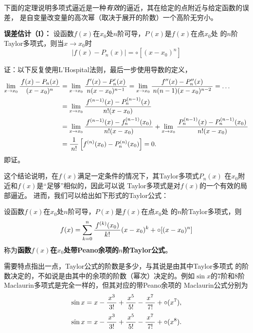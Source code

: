下面的定理说明多项式逼近是一种{\it 有效}的逼近，其在给定的点附近与给定函数的误差，
是自变量改变量的高次幂（取决于展开的阶数）一个高阶无穷小。

\begin{thx}
	{\bf 误差估计（I）：}
	设函数$f(x)$在$x_0$处$n$阶可导，$P(x)$是$f(x)$在点$x_0$处
	的$n$阶Taylor多项式，则当$x\to x_0$时
	$${|f(x)-P_n(x)|=\circ[(x-x_0)^n]}$$
\end{thx}

证：以下反复使用L'Hospital法则，最后一步使用导数的定义，
\begin{align*}
	\lim\limits_{x\to{x_0}}\displaystyle\frac{\,{f(x)-P_n(x)}\,}{\,{(x-x_0)^n}\,}
	&=\lim\limits_{x\to{x_0}}\displaystyle\frac{\,{f'(x)-P'_n(x)}\,}{\,{n(x-x_0)^{n-1}}\,}
	=\lim\limits_{x\to{x_0}}\displaystyle\frac{\,{f''(x)-P''_n(x)}\,}{\,{n(n-1)(x-x_0)^{n-2}}\,}=\ldots\\
	&=\lim\limits_{x\to{x_0}}\displaystyle\frac{\,{f^{(n-1)}(x)-P^{(n-1)}_n(x)}\,}{\,{n!(x-x_0)}\,}\\
	&=\lim\limits_{x\to{x_0}}\displaystyle\frac{\,{f^{(n-1)}(x)-f^{(n-1)}_n(x_0)}\,}{\,{n!(x-x_0)}\,}
	+\lim\limits_{x\to{x_0}}\displaystyle\frac{\,{P_n^{(n-1)}(x)-P^{(n-1)}_n(x_0)}\,}{\,{n!(x-x_0)}\,}\\
	&=\displaystyle\frac{\,{1}\,}{\,{n!}\,}\left[f^{(n)}(x_0)-P_n^{(n)}(x_0)\right]=0.
\end{align*}
即证。\fin

这个结论说明，在$f(x)$满足一定条件的情况下，其Taylor多项式$P_n(x)$
在$x_0$附近和$f(x)$是{\kaishu “足够”}相似的，因此可以说
Taylor多项式是对$f(x)$的一个有效的{\kaishu 局部逼近}。
进而，我们可以给出如下形式的Taylor公式：

\begin{thx}
	设函数$f(x)$在$x_0$处$n$阶可导，$P(x)$是$f(x)$在点$x_0$处
	的$n$阶Taylor多项式，则
	  $$f(x)=\sum\limits_{k=0}^n\displaystyle\frac{\,{f^{(k)}(x_0)}\,}{\,{k!}\,}(x-x_0)^k
	  +\circ[(x-x_0)^n]$$
	称为{\bf 函数$f(x)$在$x_0$处带Peano余项的$n$阶Taylor公式}。
\end{thx}

需要特点指出一点，Taylor公式的阶数是多少，与其说是由其中Taylor多项式
的阶数决定的，不如说是由其中的余项的阶数（幂次）决定的。例如$\sin x$的7阶和8阶Maclaurin多项式是完全一样的，但其对应的带Peano余项的
Maclaurin公式分别为
$$\sin x=x-\displaystyle\frac{\,{x^3}\,}{\,{3!}\,}+\displaystyle\frac{\,{x^5}\,}{\,{5!}\,}-\displaystyle\frac{\,{x^7}\,}{\,{7!}\,}+\circ(x^7),$$
$$\sin x=x-\displaystyle\frac{\,{x^3}\,}{\,{3!}\,}+\displaystyle\frac{\,{x^5}\,}{\,{5!}\,}-\displaystyle\frac{\,{x^7}\,}{\,{7!}\,}+\circ(x^8).$$

